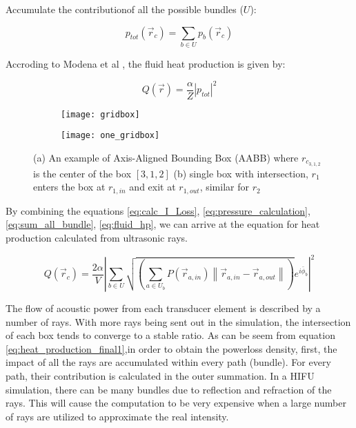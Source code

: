 Accumulate the contributionof all the possible bundles ($U$):

\begin{equation} \label{eq:sum_all_bundle}
    p_{tot}(\vec{r}_c)=\sum_{b \in U}p_b(\vec{r}_c)
\end{equation}

Accroding to Modena et al \cite{Modena_2018}, the fluid heat production is given by:

\begin{equation} \label{eq:fluid_hp}
    Q(\vec{r})=\frac{\alpha}{Z}|p_{tot}|^2
\end{equation}

\begin{figure}
    \centering
    \begin{subfigure}[b]{0.45\textwidth}
        \texttt{[image: gridbox]}
        \caption{}
        \label{fig:gridbox}
    \end{subfigure}
    \begin{subfigure}[b]{0.5\textwidth}
        \texttt{[image: one\_gridbox]}
        \caption{}
        \label{fig:one_gridbox}
    \end{subfigure}
    \caption{(a) An example of Axis-Aligned Bounding Box (AABB) where $r_{c_{3,1,2}}$ is the center of the box $[3,1,2]$ (b) single box with intersection, $r_1$ enters the box at $r_{1,in}$ and exit at $r_{1,out}$, similar for $r_2$}
\end{figure}

By combining the equations \ref{eq:calc_I_Loss}, \ref{eq:pressure_calculation}, \ref{eq:sum_all_bundle}, \ref{eq:fluid_hp}, we can arrive at the equation for heat production calculated from ultrasonic rays.

\begin{equation} \label{eq:heat_production_final1}
    Q(\vec{r}_c)=\frac{2\alpha}{V}\left|\sum_{b \in U}\sqrt{(\sum_{a \in U_b}P(\vec{r}_{a,in})\left\|\vec{r}_{a,in}-\vec{r}_{a,out}\right\|)} e^{i\bar{\phi}_b}\right|^2
\end{equation}

The flow of acoustic power from each transducer element is described by a number of rays\cite{sonalleve}. With more rays being sent out in the simulation, the intersection of each box tends to converge to a stable ratio. As can be seem from equation \ref{eq:heat_production_final1},in order to obtain the powerloss density, first, the impact of all the rays are accumulated within every path (bundle). For every path, their contribution is calculated in the outer summation. In a HIFU simulation, there can be many bundles due to reflection and refraction of the rays. This will cause the computation to be very expensive when a large number of rays are utilized to approximate the real intensity. 

